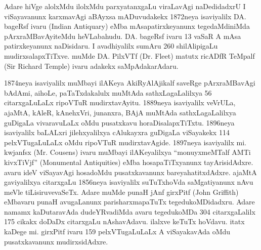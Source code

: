 \documentclass[11pt,a4size]{article}
\begin{document}
Adare hiVge alolxMdu ilolxMdu parxyatanxgaLu viraLavAgi naDedidadxrU I
viSayavanunx karxmavAgi aBAyxsa mADuvudakekx 1872neya isaviyalilx
DA. bageRsf ivaru {\rm (Indian Antiquary)} eMba
mAsapatirxkeyanunx tegedaMdiniMda pArxraMBavAyiteMdu
heVLabahudu. DA. bageRsf ivaru 13 vaSaR A mAsa patirxkeyanunx
naDisidaru. I avadhiyalilx sumAru 260 shilAlipigaLu
mudirxsalapxTiTxve. muMde DA. PilxVTf {\rm (Dr. Fleet)}
matutx ricADfR TeMpalf {\rm (Sir Richard Temple)} ivaru
adakekx saMpAdakarAdaru.

1874neya isaviyalilx muMbayi ilAKeya AkiRyAlAjikalf saveRge
pArxraMBavAgi bAdAmi, aihoLe, paTaTxdakalulx muMtAda sathxLagaLalilxya
56 citarxgaLuLaLx ripoVTuR mudirxtavAyitu. 1889neya isaviyalilx
veVrULa, ajaMtA, kAleR, kAnehxVri, junanxra, BAjA muMtAda
sathxLagaLalilxya guDigaLa vivaravuLaLx oMdu pusatxkavu
horaDisalapxTiTxtu. 1896neya isaviyalilx baLALxri jilehxyalilxya
cAlukayxra guDigaLa viSayakekx 114 pelxVTugaLuLaLx oMdu ripoVTuR
mudirxtavAgide. 1897neya isaviyalilx mi. kwjanfsx {\rm
    (Mr. Cousens)} ivaru muMbayi ilAKeyalilxya ``monuyxmeMTalf AMTi
kivxTiVjf'' {\rm (Monumental Antiquities)} eMba
hosapaTiTxyanunx tayArisidAdxre. avaru ideV viSayavAgi hosadoMdu
pusatxkavanunx bareyahatitxdAdxre. ajaMtA gaviyalilxya citarxgaLu
1856neya isaviyalilx suTuTxhoVda saMgatiyanunx nAvu meVle
tiLisiruvevaSeTx. Adare muMde punaH jAnf girxPitf {\rm
    (John Griffith)} eMbavaru punaH avugaLanunx parisharxmapaTuTx
tegedukoMDidadxru. Adare namamx kaDutaravAda dudeYRvadiMda avaru
tegedukoMDa 304 citarxgaLalilx 175 cikakx doDaDx citarxgaLu
nAshavAdavu. ilalxve keTuTx hoVdavu. itatx kaDege mi. girxPitf ivaru
159 pelxVTugaLuLaLx A viSayakavAda oMdu pusatxkavanunx mudirxsidAdxre.
\end{document}
